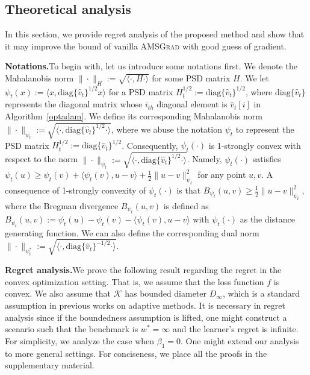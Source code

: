 \documentclass[11pt]{article}
\def\K{\mathcal{K}}
\theoremstyle{k}
\begin{document}
\subsection{Theoretical analysis}
In this section, we provide regret analysis of the proposed method and show that it may improve the bound of vanilla \textsc{AMSGrad} with good guess of gradient.

\textbf{Notations.}\hspace{0.1in}To begin with, let us introduce some notations first.
We denote the Mahalanobis norm $\|\cdot\|_H := \sqrt{ \langle \cdot, H \cdot \rangle }$ for some PSD matrix $H$.
We let $\psi_t(x) := \langle x, \text{diag}\{\hat{v}_t\}^{1/2} x \rangle$ for a PSD matrix $H_t^{1/2}:= \text{diag}\{\hat{v}_t\}^{1/2}$, 
where $\text{diag}\{\hat{v}_t\}$ represents the diagonal matrix whose $i_{th}$ diagonal element is $\hat{v}_t[i]$ in Algorithm~\ref{optadam}.
We define its corresponding Mahalanobis norm $\| \cdot \|_{\psi_t}:= 
\sqrt{ \langle \cdot, \text{diag}\{\hat{v}_t\}^{1/2} \cdot \rangle }$,
where we abuse the notation $\psi_t$ to represent the PSD matrix $H_t^{1/2}:=\text{diag}\{\hat{v}_t\}^{1/2}$.
Consequently,
$\psi_t(\cdot)$ is 1-strongly convex with respect to the norm $\| \cdot \|_{\psi_t}:= 
\sqrt{ \langle \cdot, \text{diag}\{\hat{v}_t\}^{1/2} \cdot \rangle }$.
Namely, $\psi_t(\cdot)$ satisfies
$\psi_t(u) \geq \psi_t(v) + \langle \psi_t(v), u - v \rangle + \frac{1}{2} \| u - v\|^2_{\psi_t}$ for any point $u,v$.
A consequence of 1-strongly convexity of $\psi_t(\cdot)$ is that $B_{\psi_t}(u,v) \geq \frac{1}{2} \| u - v \|^2_{\psi_t}$, where the Bregman divergence $B_{\psi_t}(u,v)$ is defined as $B_{\psi_t}(u,v) := \psi_t(u) - \psi_t(v) - \langle \psi_t(v), u - v \rangle$ with $\psi_t(\cdot)$ as the distance generating function.
We can also define the corresponding dual norm $\| \cdot \|_{\psi_t^*}:= \sqrt{ \langle \cdot, \text{diag}\{\hat{v}_t\}^{-1/2} \cdot \rangle }$.

\textbf{Regret analysis.}\hspace{0.1in}We prove the following result regarding the regret in the convex optimization setting. That is, we assume that the loss function $f$ is convex. We also assume that $\K$ has bounded diameter $D_{\infty}$, which is a standard assumption in previous works \cite{RKK18,KB15} on adaptive methods. It is necessary in regret analysis since if the boundedness assumption is lifted, one might construct a scenario such that the benchmark is $w^* = \infty$ and the learner's regret is infinite. For simplicity, we analyze the case when $\beta_{1}=0$. One might extend our analysis to more general settings. For conciseness, we place all the proofs in the supplementary material.
\end{document}
